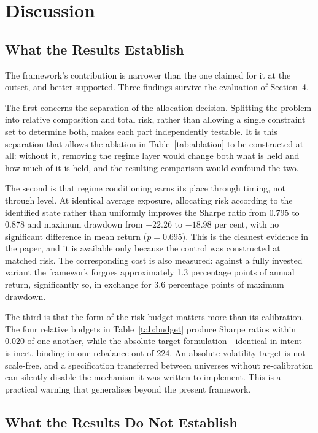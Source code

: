 \section{Discussion}
\label{sec:discussion}

\subsection{What the Results Establish}

The framework's contribution is narrower than the one claimed for it at the outset, and
better supported. Three findings survive the evaluation of Section~4.

The first concerns the separation of the allocation decision. Splitting the problem into
relative composition and total risk, rather than allowing a single constraint set to
determine both, makes each part independently testable. It is this separation that
allows the ablation in Table~\ref{tab:ablation} to be constructed at all: without it, removing the regime
layer would change both what is held and how much of it is held, and the resulting
comparison would confound the two.

The second is that regime conditioning earns its place through timing, not through
level. At identical average exposure, allocating risk according to the identified state
rather than uniformly improves the Sharpe ratio from 0.795 to 0.878 and maximum
drawdown from $-22.26$ to $-18.98$ per cent, with no significant difference in mean
return ($p = 0.695$). This is the cleanest evidence in the paper, and it is available only
because the control was constructed at matched risk. The corresponding cost is also
measured: against a fully invested variant the framework forgoes approximately 1.3
percentage points of annual return, significantly so, in exchange for 3.6 percentage
points of maximum drawdown.

The third is that the form of the risk budget matters more than its calibration. The
four relative budgets in Table~\ref{tab:budget} produce Sharpe ratios within 0.020 of one another,
while the absolute-target formulation---identical in intent---is inert, binding in one
rebalance out of 224. An absolute volatility target is not scale-free, and a
specification transferred between universes without re-calibration can silently disable
the mechanism it was written to implement. This is a practical warning that generalises
beyond the present framework.

\subsection{What the Results Do Not Establish}

